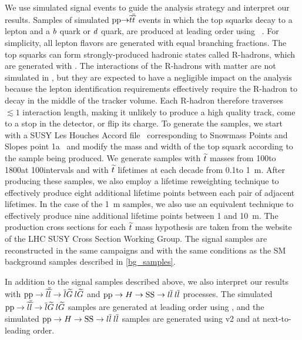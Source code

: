 We use simulated signal events to guide the analysis strategy and interpret our results. Samples of simulated $\mathrm{p}\mathrm{p} {\to} \widetilde{t} \overline{\widetilde{t}}$ events in which the top squarks decay to a lepton and a $b$ quark or $d$ quark, are produced at leading order using ~\cite{PYTHIA8}. For simplicity, all lepton flavors are generated with equal branching fractions. The top squarks can form strongly-produced hadronic states called R-hadrons, which are generated with \PYTHIA. The interactions of the R-hadrons with matter are not simulated in \GEANTfour, but they are expected to have a negligible impact on the analysis because the lepton identification requirements effectively require the R-hadron to decay in the middle of the tracker volume. Each R-hadron therefore traverses $\lesssim1$ interaction length, making it unlikely to produce a high quality track, come to a stop in the detector, or flip its charge. To generate the samples, we start with a SUSY Les Houches Accord file~\cite{LesHouches} corresponding to Snowmass Points and Slopes point 1a~\cite{SPS} and modify the mass and width of the top squark according to the sample being produced. We generate samples with $\widetilde{t}$ masses from 100\GeV to 1800\GeV at 100\GeV intervals and with $\widetilde{t}$ lifetimes at each decade from 0.1\mm to 1~m. After producing these samples, we also employ a lifetime reweighting technique to effectively produce eight additional lifetime points between each pair of adjacent lifetimes. In the case of the 1~m samples, we also use an equivalent technique to effectively produce nine additional lifetime points between 1 and 10~m.  The production cross sections for each $\widetilde{t}$ mass hypothesis are taken from the website of the LHC SUSY Cross Section Working Group. The signal samples are reconstructed in the same campaigns and with the same conditions as the SM background samples described in \ref{bg_samples}.

In addition to the signal samples described above, we also interpret our results with $\mathrm{p}\mathrm{p} \to \widetilde{l}\overline{\widetilde{l}} \to \overline{l}\widetilde{G}\:l\widetilde{G}$ and $\mathrm{p}\mathrm{p} \to H \to \mathrm{S}\mathrm{S} \to l\overline{l}\:l\overline{l}$ processes. The simulated $\mathrm{p}\mathrm{p} \to \widetilde{l}\overline{\widetilde{l}} \to \overline{l}\widetilde{G}\:l\widetilde{G}$ samples are generated at leading order using \MGvATNLO, and the simulated $\mathrm{p}\mathrm{p} \to H \to \mathrm{S}\mathrm{S} \to l\overline{l}\:l\overline{l}$  samples are generated using \POWHEG v2 and  at next-to-leading order.

\pagebreak